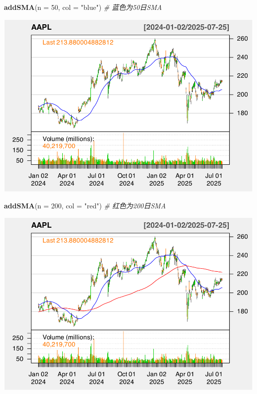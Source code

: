 \documentclass[]{ctexbook}
\newenvironment{Shaded}{\begin{snugshade}}{\end{snugshade}}
\newcommand{\AttributeTok}[1]{\textcolor[rgb]{0.13,0.29,0.53}{#1}}
\newcommand{\CommentTok}[1]{\textcolor[rgb]{0.56,0.35,0.01}{\textit{#1}}}
\newcommand{\DecValTok}[1]{\textcolor[rgb]{0.00,0.00,0.81}{#1}}
\newcommand{\FunctionTok}[1]{\textcolor[rgb]{0.13,0.29,0.53}{\textbf{#1}}}
\newcommand{\NormalTok}[1]{#1}
\newcommand{\StringTok}[1]{\textcolor[rgb]{0.31,0.60,0.02}{#1}}
\begin{document}
\begin{Shaded}
\begin{Highlighting}[]
\FunctionTok{addSMA}\NormalTok{(}\AttributeTok{n =} \DecValTok{50}\NormalTok{, }\AttributeTok{col =} \StringTok{"blue"}\NormalTok{)  }\CommentTok{\# 蓝色为50日SMA}
\end{Highlighting}
\end{Shaded}

\includegraphics[width=0.9\linewidth]{QuantmodHandbook_files/figure-latex/sma_2-2}

\begin{Shaded}
\begin{Highlighting}[]
\FunctionTok{addSMA}\NormalTok{(}\AttributeTok{n =} \DecValTok{200}\NormalTok{, }\AttributeTok{col =} \StringTok{"red"}\NormalTok{)  }\CommentTok{\# 红色为200日SMA}
\end{Highlighting}
\end{Shaded}

\includegraphics[width=0.9\linewidth]{QuantmodHandbook_files/figure-latex/sma_2-3}
\end{document}
